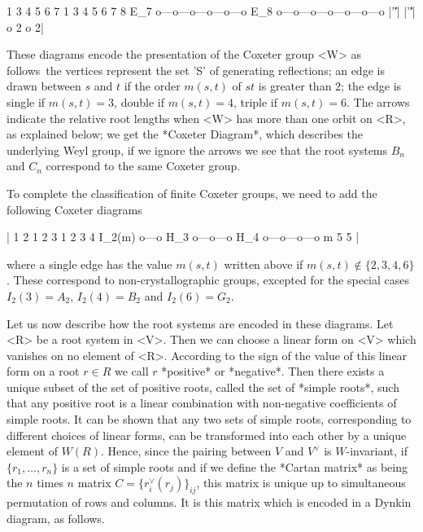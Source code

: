          1   3   4   5   6   7            1   3   4   5   6   7   8
   E_7   o---o---o---o---o---o       E_8  o---o---o---o---o---o---o
                 |'\|'|                                |'\|'|
                 o 2                              o 2|
\par\bigskip
These  diagrams  encode  the  presentation  of  the  Coxeter  group  <W> as
follows\:\ the vertices represent the set 'S' of generating reflections; an
edge  is drawn between $s$ and $t$ if the order $m(s,t)$ of $st$ is greater
than $2$; the edge is single if $m(s,t)=3$, double if $m(s,t)=4$, triple if
$m(s,t)=6$. The arrows indicate the relative root lengths when <W> has more
than  one orbit on <R>,  as explained below; we  get the *Coxeter Diagram*,
which describes the underlying Weyl group, if we ignore the arrows\: we see
that the root systems $B_n$ and $C_n$ correspond to the same Coxeter group.

To complete the classification of finite Coxeter groups, we need to add the
following Coxeter diagrams\:

|             1   2                 1   2   3          1   2   3   4
   I_2(m)    o---o            H_3  o---o---o     H_4  o---o---o---o
               m                     5                  5           |

where  a single edge has the value $m(s,t)$ written above if $m(s,t)\not\in
\{2,3,4,6\}$. These correspond to non-crystallographic groups, excepted for
the special cases $I_2(3)=A_2$, $I_2(4)=B_2$ and $I_2(6)=G_2$.

Let us now describe how the root systems are encoded in these diagrams. Let
<R>  be a root system in <V>. Then we can choose a linear form on <V> which
vanishes  on no element of <R>. According to  the sign of the value of this
linear  form on a root $r \in R$ we call $r$ *positive* or *negative*. Then
there  exists a unique subset of the  set of positive roots, called the set
of *simple roots*, such that any positive root is a linear combination with
non-negative  coefficients of  simple roots.  It can  be shown that any two
sets  of simple roots, corresponding to  different choices of linear forms,
can  be transformed into each  other by a unique  element of $W(R)$. Hence,
since   the  pairing  between   $V$  and  $V^\vee$   is  $W$-invariant,  if
$\{r_1,\ldots,r_n\}$  is a set of simple roots and if we define the *Cartan
matrix*  as being the $n$ times $n$ matrix $C=\{r_i^\vee(r_j)\}_{ij}$, this
matrix  is unique up to simultaneous permutation of rows and columns. It is
this matrix which is encoded in a Dynkin diagram, as follows.

